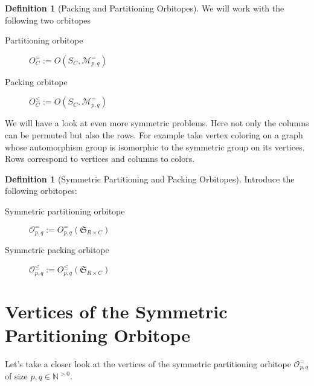 \documentclass[a4paper]{amsart}
\theoremstyle{lemma}
\theoremstyle{definition}
\newtheorem{defn}[theorem]{Definition}
\theoremstyle{remark}
\newcommand\mpar[1]{\marginpar {\flushleft\sffamily\small #1}}
\newcommand{\todo}[1]{\mpar{#1}}
\newcommand{\lr}[1]{\ensuremath{\left( #1 \right)}}
\newcommand{\naturals}{\ensuremath{\mathbb{N}}}
\newcommand{\M}{\ensuremath{\mathcal{M}}}
\newcommand{\calO}{\ensuremath{\mathcal{O}}}
\newcommand{\Sym}{\ensuremath{\mathfrak{S}}}
\begin{document}


\begin{defn}[Packing and Partitioning Orbitopes]
  We will work with the following two orbitopes
  \begin{description}
    \item[Partitioning orbitope] \(O^=_C := O \lr{S_C, \M_{p,q}^=}\)
    \item[Packing orbitope] \(O^{\leq}_C := O \lr{S_C, \M_{p,q}^=}\)
   \end{description}
\end{defn}

We will have a look at even more symmetric problems.  Here not only
the columns can be permuted but also the rows.  For example take
vertex coloring on a graph whose automorphism group is isomorphic to
the symmetric group on its vertices.  Rows correspond to vertices and
columns to colors.

\begin{defn}[Symmetric Partitioning and Packing Orbitopes]
Introduce the following orbitopes:
\begin{description}
\item[Symmetric partitioning orbitope] \(\mathcal{O}^=_{p,q} := O^=_{p, q} \lr{\Sym_{R \times C}} \)
\item[Symmetric packing orbitope] \(\mathcal{O}^\leq_{p,q} := O^\leq_{p, q} \lr{\Sym_{R \times C}} \)
\end{description}
\end{defn}




\section{Vertices of the Symmetric Partitioning Orbitope}
Let's take a closer look at the
vertices of the symmetric partitioning orbitope \(\calO^=_{p, q}\) of size
\(p, q \in \naturals^{>0}\).
\end{document}
